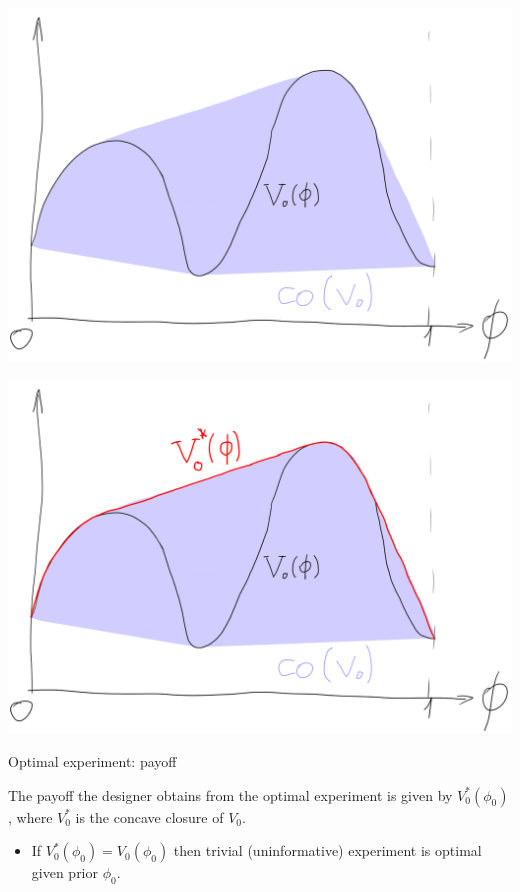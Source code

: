 \documentclass[english,10pt
,aspectratio=169
]{beamer}
\begin{document}
\begin{frame}
	\centering
	\includegraphics[scale=0.3]{pics/M7/concav2.png}
\end{frame}


\begin{frame}
	\centering
	\includegraphics[scale=0.3]{pics/M7/concav3.png}
\end{frame}


\begin{frame}{Optimal experiment: payoff}
\begin{theorem}
	The payoff the designer obtains from the optimal experiment is given by $V_0^*(\phi_0)$, where $V_0^*$ is the concave closure of $V_0$.
\end{theorem}
\begin{itemize}
	\item If $V_0^*(\phi_0) = V_0(\phi_0)$ then trivial (uninformative) experiment is optimal given prior $\phi_0$.
\end{itemize}
\end{frame}
\end{document}
